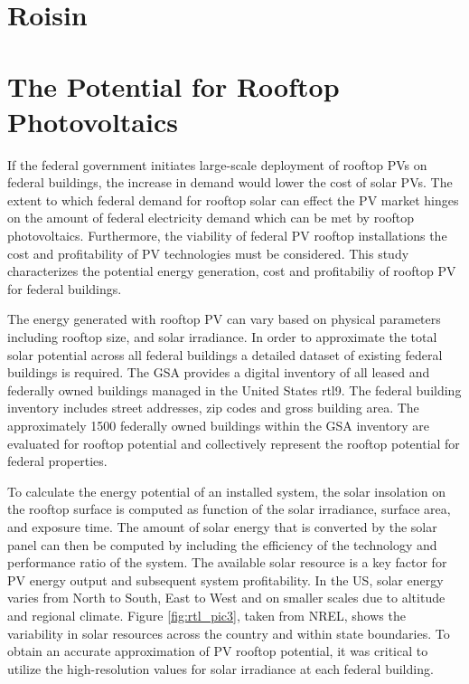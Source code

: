 \section{Roisin}
\section{The Potential for Rooftop Photovoltaics}
\par
 If the federal government initiates large-scale deployment of rooftop PVs on federal buildings, the increase in demand would lower the cost of solar PVs. The extent to which federal demand for rooftop solar can effect the PV market hinges on the amount of federal electricity demand which can be met by rooftop photovoltaics. Furthermore, the viability of federal PV rooftop installations the cost and profitability of PV technologies must be considered. This study characterizes the potential energy generation, cost and profitabiliy of rooftop PV for federal buildings.

The energy generated with rooftop PV can vary based on physical parameters including rooftop size, and solar irradiance.  In order to approximate the total solar potential across all federal buildings a detailed dataset of existing federal buildings is required. The GSA provides a digital inventory of all leased and federally owned buildings managed in the United States \cite{roisin}{rtl9}. The federal building inventory includes street addresses, zip codes and gross building area. The approximately 1500 federally owned buildings within the GSA inventory are evaluated for rooftop potential and collectively represent the rooftop potential for federal properties.

\par
To calculate the energy potential of an installed system, the solar insolation on the rooftop surface is computed as function of the solar irradiance, surface area, and exposure time. The amount of solar energy that is converted by the solar panel can then be computed by including the efficiency of the technology and performance ratio of the system. The available solar resource is a key factor for PV energy output and subsequent system profitability. In the US, solar energy varies from North to South, East to West and on smaller scales due to altitude and regional climate. Figure \ref{fig:rtl_pic3}, taken from NREL, shows the variability in solar resources across the country and within state boundaries.  To obtain an accurate approximation of PV rooftop potential, it was critical to utilize the high-resolution values for solar irradiance at each federal building. 

